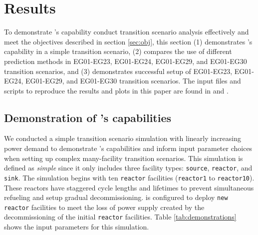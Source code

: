 \section{Results}
To demonstrate \deploy's capability conduct transition
scenario analysis effectively and meet the objectives described in section 
\ref{sec:obj}, this section 
(1) demonstrates \deploy's capability in a simple transition scenario, 
(2) compares the use of different \deploy prediction methods in EG01-EG23, EG01-EG24, 
EG01-EG29, and EG01-EG30 transition scenarios, and
(3) demonstrates successful \deploy setup of EG01-EG23, EG01-EG24, 
EG01-EG29, and EG01-EG30 transition scenarios. 
The input files and scripts to reproduce the results and plots in this
paper are found in \cite{noauthor_arfc/d3ploy:_2019} and 
\cite{chee_arfc/transition-scenarios_2018}. 

\subsection{Demonstration of \deploy's capabilities}
\label{sec:demo}
We conducted a simple transition scenario simulation with
linearly increasing power demand
to demonstrate \deploy's capabilities and inform input parameter 
choices when setting up complex many-facility transition scenarios. 
This simulation is defined as \textit{simple} since 
it only includes
three facility types: \texttt{source}, \texttt{reactor}, and 
\texttt{sink}. 
The simulation begins with ten \texttt{reactor} facilities 
(\texttt{reactor1} to \texttt{reactor10}). 
These reactors have staggered cycle lengths and lifetimes to prevent 
simultaneous refueling and setup gradual decommissioning. 
\deploy is configured to deploy \texttt{new reactor} facilities
to meet the loss of power supply created by the decommissioning 
of the initial \texttt{reactor} facilities. 
Table \ref{tab:demonstrations} shows the \deploy input parameters 
for this simulation.  

